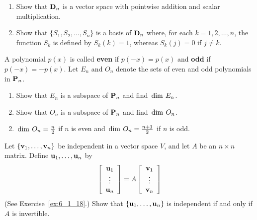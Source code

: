 \begin{multicols}{2}
\begin{ex}
\begin{enumerate}[label={\alph*.}]
\item Show that $\textbf{D}_{n}$ is a vector space with pointwise addition and scalar multiplication.

\item Show that $\{S_{1}, S_{2}, \dots, S_{n}\}$ is a basis of $\textbf{D}_{n}$ where, for each $k = 1, 2, \dots, n$, the function $S_{k}$ is defined by $S_{k}(k) = 1$, whereas $S_{k}(j) = 0$ if $j \neq k$.

\end{enumerate}
\end{ex}

\begin{ex}\label{ex:ex6_3_36}
A polynomial $p(x)$ is called \textbf{even} if $p(-x) = p(x)$ and \textbf{odd} if $p(-x) = -p(x)$. Let $E_{n}$ and $O_{n}$ denote the sets of even and odd polynomials in $\textbf{P}_{n}$.

\begin{enumerate}[label={\alph*.}]
\item Show that $E_{n}$ is a subspace of $\textbf{P}_{n}$ and find $\thinspace\operatorname{dim\medspace} E_{n}$.

\item Show that $O_{n}$ is a subspace of $\textbf{P}_{n}$ and find $\thinspace\operatorname{dim\medspace} O_{n}$.

\end{enumerate}
\begin{sol}
\begin{enumerate}[label={\alph*.}]
\setcounter{enumi}{1}
\item  $\thinspace\operatorname{dim \medspace} O_n = \tfrac{n}{2}$ if $n$ is even and $\thinspace\operatorname{dim \medspace} O_n = \tfrac{n + 1}{2}$ if $n$ is odd.

\end{enumerate}
\end{sol}
\end{ex}

\begin{ex}
Let $\{\textbf{v}_{1}, \dots, \textbf{v}_{n}\}$ be independent in a vector space $V$, and let $A$ be an $n \times n$ matrix. Define $\textbf{u}_{1}, \dots, \textbf{u}_{n}$ by
\begin{equation*}
\left[ \begin{array}{c}
\textbf{u}_1 \\
\vdots \\
\textbf{u}_n
\end{array} \right]
= A
\left[ \begin{array}{c}
\textbf{v}_1 \\
\vdots \\
\textbf{v}_n
\end{array} \right]
\end{equation*}
(See Exercise~\ref{ex:6_1_18}.) Show that $\{\textbf{u}_{1}, \dots, \textbf{u}_{n}\}$ is independent if and only if $A$ is invertible.
\end{ex}
\end{multicols}
